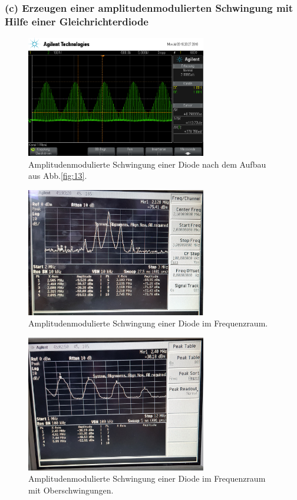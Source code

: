 \subsubsection{(c) Erzeugen einer amplitudenmodulierten Schwingung
mit Hilfe einer Gleichrichterdiode}
\label{subsubsec:auswertung_c}

\begin{figure}
  \centering
  \includegraphics[width=0.7\textwidth]{osci/amp_mod_diode.png}
  \caption{Amplitudenmodulierte
  Schwingung einer Diode nach dem Aufbau aus Abb.\ref{fig:13}.}
  \label{fig:diode_zeit}
\end{figure}


\begin{figure}
  \centering
  \includegraphics[width=0.7\textwidth]{spec/frequenzbereich_klein_diode.jpg}
  \caption{Amplitudenmodulierte
Schwingung einer Diode im Frequenzraum.}
  \label{fig:diode_frequenz_klein}
\end{figure}


\begin{figure}
  \centering
  \includegraphics[width=0.7\textwidth]{spec/frequenzbereich_gross_diode.jpg}
  \caption{Amplitudenmodulierte
Schwingung einer Diode im Frequenzraum mit Oberschwingungen.}
\label{fig:diode_frequenz_gross}
\end{figure}




